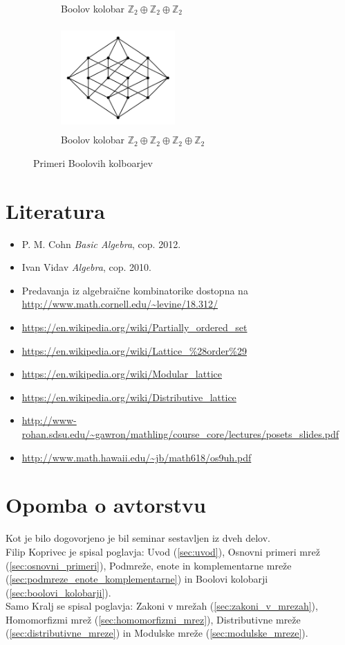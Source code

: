 \documentclass[a4paper]{article}
\begin{document}
\begin{figure}[h]
\begin{subfigure}[b]{0.5\textwidth}
\caption{Boolov kolobar $\mathbb{Z}_2 \oplus \mathbb{Z}_2 \oplus \mathbb{Z}_2$}
\end{subfigure}
\hfill
\begin{subfigure}[b]{0.5\textwidth}
\centering
\includegraphics[width=0.48\textwidth, height=4cm]{bool4}
\caption{Boolov kolobar $\mathbb{Z}_2 \oplus \mathbb{Z}_2 \oplus \mathbb{Z}_2 \oplus \mathbb{Z}_2$}
\end{subfigure}
\caption{Primeri Boolovih kolboarjev}
\label{im:boolean_ring_hasse_diagram}
\end{figure}

\pagebreak
\section{Literatura}
\begin{itemize}
\item P. M. Cohn {\em Basic Algebra},  cop. 2012.
\item Ivan Vidav {\em Algebra}, cop. 2010.
\item Predavanja iz algebraične kombinatorike dostopna na \url{http://www.math.cornell.edu/~levine/18.312/}
\item \url{https://en.wikipedia.org/wiki/Partially_ordered_set}
\item \url{https://en.wikipedia.org/wiki/Lattice_\%28order\%29}
\item \url{https://en.wikipedia.org/wiki/Modular_lattice}
\item \url{https://en.wikipedia.org/wiki/Distributive_lattice}
\item \url{http://www-rohan.sdsu.edu/~gawron/mathling/course_core/lectures/posets_slides.pdf}
\item \url{http://www.math.hawaii.edu/~jb/math618/os9uh.pdf}

\end{itemize}


\section*{Opomba o avtorstvu}
Kot je bilo dogovorjeno je bil seminar sestavljen iz dveh delov.\\
Filip Koprivec je spisal poglavja: Uvod (\ref{sec:uvod}), Osnovni primeri mrež (\ref{sec:osnovni_primeri}), Podmreže, enote in komplementarne mreže (\ref{sec:podmreze_enote_komplementarne}) in Boolovi kolobarji (\ref{sec:boolovi_kolobarji}).\\
Samo Kralj se spisal poglavja: Zakoni v mrežah (\ref{sec:zakoni_v_mrezah}), Homomorfizmi mrež (\ref{sec:homomorfizmi_mrez}), Distributivne mreže (\ref{sec:distributivne_mreze}) in Modulske mreže (\ref{sec:modulske_mreze}).
\end{document}
